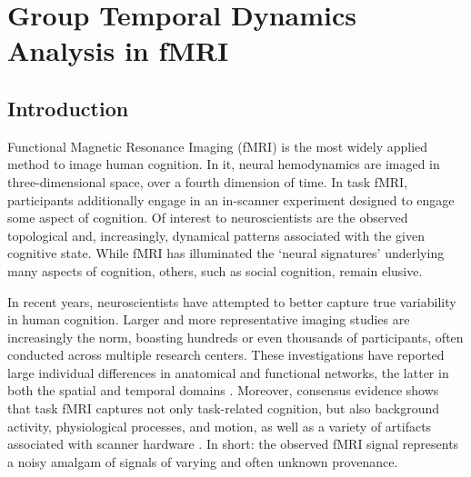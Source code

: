 \chapter{Group Temporal Dynamics Analysis in fMRI}\label{ch:fmri}

\section{Introduction}
\label{ch1:sec:intro}

Functional Magnetic Resonance Imaging (fMRI) is the most widely applied method to image human cognition. In it, neural hemodynamics are imaged in three-dimensional space, over a fourth dimension of time. In task fMRI, participants additionally engage in an in-scanner experiment designed to engage some aspect of cognition. Of interest to neuroscientists are the observed topological and, increasingly, dynamical patterns associated with the given cognitive state. While fMRI has illuminated the `neural signatures' underlying many aspects of cognition, others, such as social cognition, remain elusive.

In recent years, neuroscientists have attempted to better capture true variability in human cognition. Larger and more representative imaging studies are increasingly the norm, boasting hundreds or even thousands of participants, often conducted across multiple research centers. These investigations have reported large individual differences in anatomical \cite{kanai2011structural} and functional networks, the latter in both the spatial \cite{mueller2013individual} and temporal domains \cite{davison2016individual}. Moreover, consensus evidence shows that task fMRI captures not only task-related cognition, but also background activity, physiological processes, and motion, as well as a variety of artifacts associated with scanner hardware \cite{liu2016noise}. In short: the observed fMRI signal represents a noisy amalgam of signals of varying and often unknown provenance.

